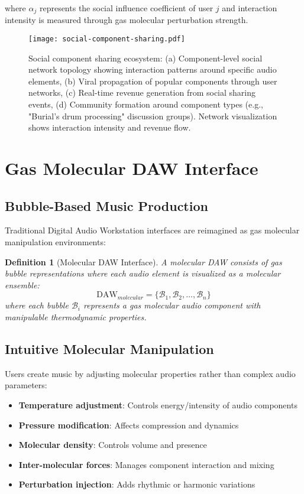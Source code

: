 \documentclass[12pt,a4paper]{article}
\newtheorem{definition}[theorem]{Definition}
\begin{document}
where $\alpha_j$ represents the social influence coefficient of user $j$ and interaction intensity is measured through gas molecular perturbation strength.

\begin{figure}[h]
\centering
\texttt{[image: social-component-sharing.pdf]}
\caption{Social component sharing ecosystem: (a) Component-level social network topology showing interaction patterns around specific audio elements, (b) Viral propagation of popular components through user networks, (c) Real-time revenue generation from social sharing events, (d) Community formation around component types (e.g., "Burial's drum processing" discussion groups). Network visualization shows interaction intensity and revenue flow.}
\label{fig:social_sharing}
\end{figure}

\section{Gas Molecular DAW Interface}

\subsection{Bubble-Based Music Production}

Traditional Digital Audio Workstation interfaces are reimagined as gas molecular manipulation environments:

\begin{definition}[Molecular DAW Interface]
A molecular DAW consists of gas bubble representations where each audio element is visualized as a molecular ensemble:
\begin{equation}
\text{DAW}_{molecular} = \{\mathcal{B}_1, \mathcal{B}_2, \ldots, \mathcal{B}_n\}
\end{equation}
where each bubble $\mathcal{B}_i$ represents a gas molecular audio component with manipulable thermodynamic properties.
\end{definition}

\subsection{Intuitive Molecular Manipulation}

Users create music by adjusting molecular properties rather than complex audio parameters:

\begin{itemize}
\item \textbf{Temperature adjustment}: Controls energy/intensity of audio components
\item \textbf{Pressure modification}: Affects compression and dynamics
\item \textbf{Molecular density}: Controls volume and presence
\item \textbf{Inter-molecular forces}: Manages component interaction and mixing
\item \textbf{Perturbation injection}: Adds rhythmic or harmonic variations
\end{itemize}
\end{document}
